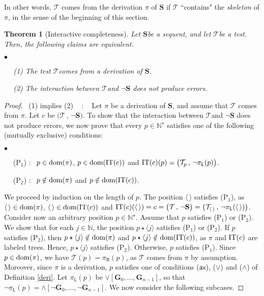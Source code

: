 \documentclass[copyright,creativecommons]{eptcs}
\newcommand{\vv}{\langle}
\newcommand{\ww}{\rangle}
\newcommand{\NN}{\mathbb{N}}
\newcommand{\axi}{\mathsf{ax}}
\newcommand{\roo}{\vv \, \ww}
\newcommand{\cT}{\mathcal{T}}
\newcommand{\bG}{\mathbf{G}}
\newcommand{\bS}{\mathbf{S}}
\newcommand{\dom}{\ensuremath{\textnormal{dom}}}
\newcommand{\CT}{\textnormal{IT}}
\newcommand{\sR}{\mathsf{R}}
\newcommand{\sL}{\mathsf{L}}
\newtheorem{theorem}{Theorem}[section]   \newtheorem{lemma}[theorem]{Lemma}
\theoremstyle{definition}
\newcommand{\squishlist}{
 \begin{list}{$\bullet$}
  { \setlength{\itemsep}{0pt}
     \setlength{\parsep}{3pt}
     \setlength{\topsep}{3pt}
     \setlength{\partopsep}{0pt}
     \setlength{\leftmargin}{1em}
     \setlength{\labelwidth}{1.5em}
     \setlength{\labelsep}{0.5em} } }
\newcommand{\squishend}{
  \end{list}  }
\begin{document}
In other words, $\cT$ comes from the derivation $\pi$ of $\bS$ if $\cT$ ``contains" the \emph{skeleton} of $\pi$, in the  sense of the beginning of this section.

 \begin{theorem}[Interactive completeness]
 Let  \/$\bS$\@ be a sequent, and let  \/$\cT$\@ be a test.
 Then, the following claims are equivalent.
 \squishlist
 \item[$\phantom{ab}$ \emph{(1)}] The test \/$\cT$\@ comes from a derivation  of  \/$\bS$\@.
 \item[$\phantom{ab}$ \emph{(2)}] The interaction between \/$\cT$\@ and  \/$\neg \bS$\@
 does not produce errors.
 \squishend
  \end{theorem}



 \begin{proof} \ (1) implies (2) \ \!\! :   \ \!\!
 Let $\pi$  be a derivation of $\bS$, and assume that $\cT$ comes from $\pi$. Let $c$ be $\big( \cT  \, , \, \neg\bS    \big)$.  To show that the interaction between \/$\cT$\@ and  \/$\neg \bS$\@
 does not produce errors,
 we   now prove that
 every
$p \in \NN^\star$ satisfies
one of the following (mutually exclusive) conditions:
\squishlist
\item[$\phantom{ab}$ (P$_1$)] : \ $p \in  \dom(\pi)$,
$p \in  \dom(\CT(c))$
and $\CT(c)(p) =  \big( \cT_p  \, , \, \neg \pi_\sL(p) \big)$.
\item[$\phantom{ab}$ (P$_2$)] : \   $p \notin \dom(\pi)$ and
$p \notin  \dom(\CT(c))$.
\squishend
 We proceed  by induction on the length of $p$.
The position $\roo$ satisfies (P$_1$),
as $\roo \in \dom(\pi)$, $\roo \in \dom(\CT(c))$  and $\CT(c)(\roo) = c =  \big( \cT  \, , \, \neg \bS \big) = \big( \cT_{\roo}  \, , \, \neg \pi_\sL(\roo) \big)$.
Consider now an  arbitrary position $p \in \NN^\star$.
Assume that $p$ satisfies (P$_1$) or (P$_2$).
We  show that for each $j \in \NN$, the position
$p\star \vv j \ww$ satisfies (P$_1$) or (P$_2$).
If $p$ satisfies (P$_2$), then
$p \star \vv j \ww \notin \dom(\pi)$ and
$p \star\vv j \ww \notin  \dom(\CT(c))$, as $\pi$ and $\CT(c)$
 are labeled trees. Hence,
 $p \star \vv j \ww$ satisfies (P$_2$).
Otherwise,  $p$ satisfies   (P$_1$). Since
 $p \in \dom(\pi)$, we have  $\cT(p) = \pi_\sR(p)$, as $\cT$ comes from $\pi$ by assumption.
 Moreover,
since $\pi$ is a derivation, $p$  satisfies
one of
 conditions  ($\axi$), ($\vee$) and ($\wedge$) of Definition
\ref{deri}. Let
$\pi_\sL(p)$ be  $\vee[\bG_{0},\ldots, \bG_{n-1}]$,
so that $\neg \pi_\sL(p)= \wedge[\neg\bG_{0},\ldots, \neg \bG_{n-1}]$.
 We now consider   the following subcases.





\end{proof}
\end{document}
